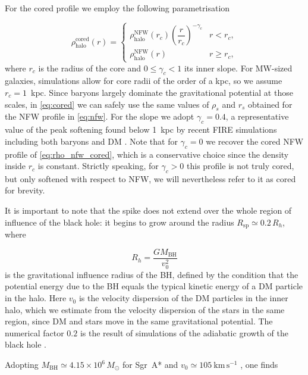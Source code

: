 For the cored profile we employ the following parametrisation

\begin{equation}
\rho_{\mathrm{halo}}^{\mathrm{cored}}(r)
=
\begin{cases}
\rho_{\mathrm{halo}}^{\mathrm{NFW}}(r_c)\left(\dfrac{r}{r_c}\right)^{-\gamma_c} & r < r_c, \\[10pt]
\rho_{\mathrm{halo}}^{\mathrm{NFW}}(r) & r \geq r_c,
\end{cases}
\label{eq:cored}
\end{equation}
where $r_c$ is the radius of the core and $0 \leq \gamma_c < 1$ its inner slope.
For MW-sized galaxies, simulations allow for core radii of the order of a
kpc, so we assume $r_c = 1$~kpc.
Since baryons largely
dominate the gravitational potential at those scales, in \cref{eq:cored} we
can safely use the same values of $\rho_s$ and $r_s$ obtained for the NFW
profile in \cref{eq:nfw}.
For the slope we adopt $\gamma_c = 0.4$, a representative value of the peak softening found below 1~kpc by recent FIRE
simulations including both baryons and DM \cite{Sameie2021}.
Note that for $\gamma_c = 0$ we recover the cored NFW profile of \cref{eq:rho_nfw_cored}, which is a conservative choice since the density inside $r_c$ is constant.
Strictly speaking, for $\gamma_c > 0$ this profile is not truly cored,
but only softened with respect to NFW, we will nevertheless refer to it as
cored for brevity.

It is important to note that the spike does not extend over the whole region of influence of the black
hole: it begins to grow around the radius $R_{\mathrm{sp}} \simeq 0.2\,
R_h$, where

\begin{equation}
R_h = \frac{G M_{\mathrm{BH}}}{v_0^{2}}
\end{equation}
is the gravitational influence radius of the BH, defined by the condition
that the potential energy due to the BH equals the typical kinetic energy
of a DM particle in the halo.
Here $v_0$ is the velocity dispersion of the
DM particles in the inner halo, which we estimate from the velocity
dispersion of the stars in the same region, since DM and stars move in the
same gravitational potential.
The numerical factor $0.2$ is the result of
simulations of the adiabatic growth of the black hole \cite{Merritt2004}.

Adopting $M_{\mathrm{BH}} \simeq 4.15 \times 10^{6}\, M_\odot$ for Sgr~A*
\cite{GRAVITY_2019} and $v_0 \simeq 105~\mathrm{km\,s^{-1}}$
\cite{balaji2023darkmatterspikessgr}, one finds

